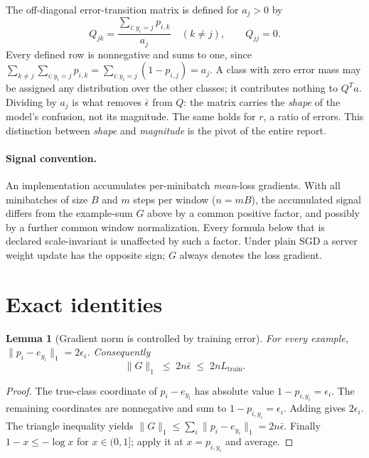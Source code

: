 \documentclass[11pt]{article}
\newtheorem{lemma}{Lemma}
\theoremstyle{remark}
\begin{document}
The off-diagonal error-transition matrix is defined for $a_j > 0$ by
\[
 Q_{jk} = \frac{\sum_{i : y_i = j} p_{i,k}}{a_j} \quad (k \ne j),
 \qquad Q_{jj} = 0 .
\]
Every defined row is nonnegative and sums to one, since
$\sum_{k\ne j}\sum_{i:y_i=j} p_{i,k} = \sum_{i:y_i=j}(1-p_{i,j}) = a_j$.
A class with zero error mass may be assigned any distribution over the other
classes; it contributes nothing to $Q^Ta$. Dividing by $a_j$ is what removes
$\bar\epsilon$ from $Q$: the matrix carries the \emph{shape} of the model's
confusion, not its magnitude. The same holds for $r$, a ratio of errors.
This distinction between \emph{shape} and \emph{magnitude} is the pivot of
the entire report.

\paragraph{Signal convention.}
An implementation accumulates per-minibatch \emph{mean}-loss gradients. With
all minibatches of size $B$ and $m$ steps per window ($n = mB$), the
accumulated signal differs from the example-sum $G$ above by a common
positive factor, and possibly by a further common window normalization. Every
formula below that is declared scale-invariant is unaffected by such a
factor. Under plain SGD a server weight update has the opposite sign; $G$
always denotes the loss gradient.

\section{Exact identities}

\begin{lemma}[Gradient norm is controlled by training error]
\label{lem:norm}
For every example, $\|p_i - e_{y_i}\|_1 = 2\epsilon_i$. Consequently
\[
 \|G\|_1 \;\le\; 2n\bar\epsilon \;\le\; 2n L_{\mathrm{train}} .
\]
\end{lemma}

\begin{proof}
The true-class coordinate of $p_i - e_{y_i}$ has absolute value
$1 - p_{i,y_i} = \epsilon_i$. The remaining coordinates are nonnegative and
sum to $1 - p_{i,y_i} = \epsilon_i$. Adding gives $2\epsilon_i$. The
triangle inequality yields
$\|G\|_1 \le \sum_i \|p_i - e_{y_i}\|_1 = 2n\bar\epsilon$. Finally
$1 - x \le -\log x$ for $x \in (0,1]$; apply it at $x = p_{i,y_i}$ and
average.
\end{proof}
\end{document}
